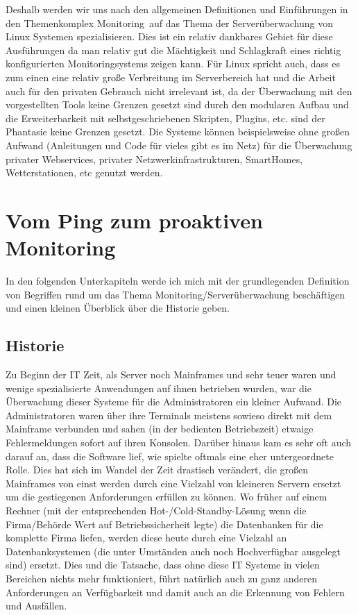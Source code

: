 \documentclass[12pt,a4paper,parskip,listof=totoc,bibliography=totoc]{scrreprt}
\begin{document}
	Deshalb werden wir uns nach den allgemeinen Definitionen und Einführungen in den Themenkomplex \glqq Monitoring\grqq\ auf das Thema der Serverüberwachung von Linux Systemen spezialisieren. Dies ist ein relativ dankbares Gebiet für diese Ausführungen da man relativ gut die Mächtigkeit und Schlagkraft eines richtig konfigurierten Monitoringsystems zeigen kann. Für Linux spricht auch, dass es zum einen eine relativ große Verbreitung im Serverbereich hat und die Arbeit auch für den privaten Gebrauch nicht irrelevant ist, da der Überwachung mit den vorgestellten Tools keine Grenzen gesetzt sind durch den modularen Aufbau und die Erweiterbarkeit mit selbstgeschriebenen Skripten, Plugins, \acrshort{etc}. sind der Phantasie keine Grenzen gesetzt. Die Systeme können beispielsweise ohne großen Aufwand (Anleitungen und Code für vieles gibt es im Netz) für die Überwachung privater Webservices, privater Netzwerkinfrastrukturen, SmartHomes, Wetterstationen, \acrshort{etc} genutzt werden.
		
	
	\chapter{Vom Ping zum proaktiven Monitoring}
	In den folgenden Unterkapiteln werde ich mich mit der grundlegenden Definition von Begriffen rund um das Thema Monitoring/Serverüberwachung beschäftigen und einen kleinen Überblick über die Historie geben.
	\section{Historie}
	Zu Beginn der IT Zeit, als Server noch Mainframes und sehr teuer waren und wenige spezialisierte Anwendungen auf ihnen betrieben wurden, war die Überwachung dieser Systeme für die Administratoren ein kleiner Aufwand. Die Administratoren waren über ihre Terminals meistens sowieso direkt mit dem Mainframe verbunden und sahen (in der bedienten Betriebszeit) etwaige Fehlermeldungen sofort auf ihren Konsolen. Darüber hinaus kam es sehr oft auch darauf an, dass die Software lief, wie spielte oftmals eine eher untergeordnete Rolle. Dies hat sich im Wandel der Zeit drastisch verändert, die großen Mainframes von einst werden durch eine Vielzahl von kleineren Servern ersetzt um die gestiegenen Anforderungen erfüllen zu können. Wo früher auf einem Rechner (mit der entsprechenden Hot-/Cold-Standby-Lösung wenn die Firma/Behörde Wert auf Betriebssicherheit legte) die Datenbanken für die komplette Firma liefen, werden diese heute durch eine Vielzahl an Datenbanksystemen (die unter Umständen auch noch Hochverfügbar ausgelegt sind) ersetzt. Dies und die Tatsache, dass ohne diese IT Systeme in vielen Bereichen nichts mehr funktioniert, führt natürlich auch zu ganz anderen Anforderungen an Verfügbarkeit und damit auch an die Erkennung von Fehlern und Ausfällen. 
	
\end{document}
